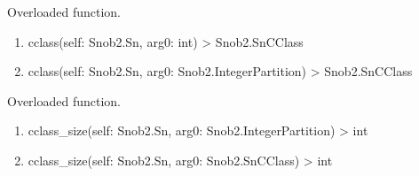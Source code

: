 \documentclass[letterpaper,10pt,english]{sphinxmanual}
\begin{document}
\begin{fulllineitems}

\begin{fulllineitems}
\label{\detokenize{index:Snob2.Sn.cclass}}
\sphinxAtStartPar
Overloaded function.
\begin{enumerate}
%
\item {} 
\sphinxAtStartPar
cclass(self: Snob2.Sn, arg0: int) \sphinxhyphen{}\textgreater{} Snob2.SnCClass

\item {} 
\sphinxAtStartPar
cclass(self: Snob2.Sn, arg0: Snob2.IntegerPartition) \sphinxhyphen{}\textgreater{} Snob2.SnCClass

\end{enumerate}

\end{fulllineitems}


\begin{fulllineitems}
\label{\detokenize{index:Snob2.Sn.cclass_size}}
\sphinxAtStartPar
Overloaded function.
\begin{enumerate}
%
\item {} 
\sphinxAtStartPar
cclass\_size(self: Snob2.Sn, arg0: Snob2.IntegerPartition) \sphinxhyphen{}\textgreater{} int

\item {} 
\sphinxAtStartPar
cclass\_size(self: Snob2.Sn, arg0: Snob2.SnCClass) \sphinxhyphen{}\textgreater{} int

\end{enumerate}

\end{fulllineitems}


\begin{fulllineitems}
\label{\detokenize{index:Snob2.Sn.character}}
\end{fulllineitems}


\end{fulllineitems}
\end{document}
